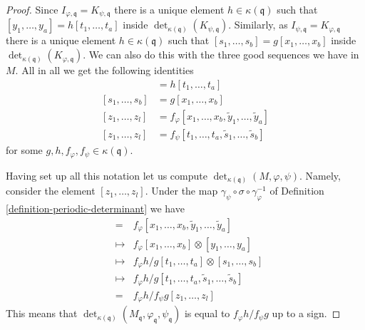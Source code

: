 \documentclass{amsart}
\theoremstyle{plain}
\theoremstyle{definition}
\theoremstyle{remark}
\numberwithin{equation}{subsection}
\begin{document}
\begin{proof}
\medskip\noindent
Since $I_{\varphi, \mathfrak q} = K_{\psi, \mathfrak q}$
there is a unique element $h \in \kappa(\mathfrak q)$ such that
$[y_1, \ldots, y_a] = h [t_1, \ldots, t_a]$
inside $\det_{\kappa(\mathfrak q)}(K_{\psi, \mathfrak q})$.
Similarly, as $I_{\psi, \mathfrak q} = K_{\varphi, \mathfrak q}$
there is a unique element $h \in \kappa(\mathfrak q)$ such that
$[s_1, \ldots, s_b] = g [x_1, \ldots, x_b]$
inside $\det_{\kappa(\mathfrak q)}(K_{\varphi, \mathfrak q})$.
We can also do this with the three good sequences we have
in $M$. All in all we get the following identities
\begin{align*}
[y_1, \ldots, y_a]
& =
h [t_1, \ldots, t_a] \\
[s_1, \ldots, s_b]
& =
g [x_1, \ldots, x_b] \\
[z_1, \ldots, z_l]
& =
f_\varphi [x_1, \ldots, x_b, \tilde y_1, \ldots, \tilde y_a] \\
[z_1, \ldots, z_l]
& =
f_\psi [t_1, \ldots, t_a, \tilde s_1, \ldots, \tilde s_b]
\end{align*}
for some $g, h, f_\varphi, f_\psi \in \kappa(\mathfrak q)$.

\medskip\noindent
Having set up all this
notation let us compute $\det_{\kappa(\mathfrak q)}(M, \varphi, \psi)$.
Namely, consider the element $[z_1, \ldots, z_l]$.
Under the map $\gamma_\psi \circ \sigma \circ \gamma_\varphi^{-1}$
of Definition \ref{definition-periodic-determinant} we have
\begin{eqnarray*}
[z_1, \ldots, z_l] & = &
f_\varphi [x_1, \ldots, x_b, \tilde y_1, \ldots, \tilde y_a] \\
& \mapsto & f_\varphi [x_1, \ldots, x_b] \otimes [y_1, \ldots, y_a] \\
& \mapsto &
f_\varphi h/g [t_1, \ldots, t_a] \otimes [s_1, \ldots, s_b] \\
& \mapsto &
f_\varphi h/g [t_1, \ldots, t_a, \tilde s_1, \ldots, \tilde s_b] \\
& = &
f_\varphi h/f_\psi g [z_1, \ldots, z_l]
\end{eqnarray*}
This means that
$\det_{\kappa(\mathfrak q)}
(M_{\mathfrak q}, \varphi_{\mathfrak q}, \psi_{\mathfrak q})$
is equal to $f_\varphi h/f_\psi g$ up to a sign.


\end{proof}
\end{document}
